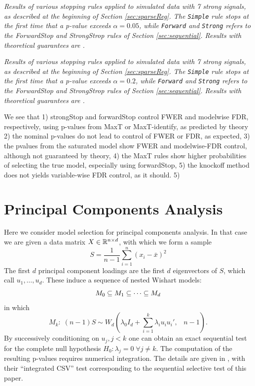 \documentclass{article}
\begin{document}
\begin{table}[ht]
\centering

\caption[tab:stopping]{\em Results of various stopping rules applied to simulated data with 7 strong signals,  as described at the beginning of Section \ref{sec:sparseReg}.
The {\tt Simple} rule stops at the first time that a p-value exceeds $\alpha=0.05$, while {\tt Forward} and {\tt Strong} refers to the ForwardStop and StrongStrop rules of Section \ref{sec:sequential}. Results with theoretical guarantees are .}
\label{tab:stopping05}
\end{table}

\begin{table}[ht]
\centering

\caption[tab:stopping]{\em Results of various stopping rules applied to simulated data with 7 strong signals,  as described at the beginning of Section \ref{sec:sparseReg}.
The {\tt Simple} rule stops at the first time that a p-value exceeds $\alpha=0.2$, while {\tt Forward} and {\tt Strong} refers to the ForwardStop and StrongStrop rules of Section \ref{sec:sequential}. Results with theoretical guarantees are .}
\label{tab:stopping20}
\end{table}

We see that 1) strongStop and forwardStop control FWER and modelwise FDR, respectively, using p-values from MaxT or MaxT-identify, as predicted by theory
2) the nominal p-values do not lead to control of FWER or FDR, as expected, 3) the pvalues from the saturated model show FWER and modelwise-FDR control,
although not guaranteed by theory, 4) the MaxT rules show higher probabilities of selecting the true model, especially using forwardStop, 5) the knockoff method
does not yields variable-wise FDR control, as it should.
5)
\section{Principal Components Analysis}
\label{sec:pca}

Here we consider model selection for   principal components analysis. In that case we are given a data matrix $X \in \mathbb{R}^{n\times d}$, with which we form a sample %
\[
S = \frac{1}{n-1} \sum_{i=1}^n(x_i - \bar x)^2
\]
The first $d$ principal component loadings are the first $d$ eigenvectors of $S$, which call $u_1,\ldots, u_d$. These induce a sequence of nested Wishart models:
\[
M_0 \subseteq M_1 \subseteq \cdots \subseteq M_d
\]
in which
\begin{equation}
  M_k:\; (n-1) S \sim W_d\left(\lambda_0 I_d + \sum_{i=1}^k     \lambda_i u_i u_i', \;\;\; n-1\right).
\end{equation}
 By successively conditioning on $u_j, j<k$ one can obtain an exact sequential test
for the complete null hypothesis $H_0: \lambda_j=0 \; \forall j \neq k$.  The computation of the resulting p-values requires numerical integration.
The details are given in \citet{choi2014selecting}, with their ``integrated CSV'' test  corresponding to the sequential selective test of this paper.
\end{document}
